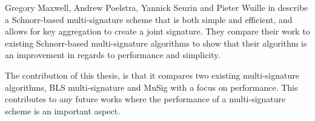 Gregory Maxwell, Andrew Poelstra, Yannick Seurin and Pieter Wuille in \cite{SchnorrMulti} describe a Schnorr-based multi-signature scheme that is both simple and efficient, and allows for key aggregation to create a joint signature. They compare their work to existing Schnorr-based multi-signature algorithms to show that their algorithm is an improvement in regards to performance and simplicity.

The contribution of this thesis, is that it compares two existing multi-signature algorithms, BLS multi-signature \cite{BLSMulti} and MuSig \cite{SchnorrMulti} with a focus on performance. This contributes to any future works where the performance of a multi-signature scheme is an important aspect.